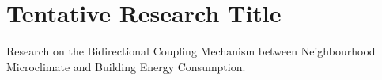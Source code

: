 \section{Tentative Research Title}

Research on the Bidirectional Coupling Mechanism between Neighbourhood Microclimate and Building Energy Consumption.
